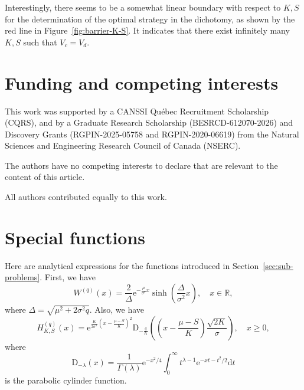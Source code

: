 \documentclass[11pt,reqno]{amsart}
\newcommand{\reals}{\mathbb{R}}
\newcommand{\Wq}{W^{(q)}}
\newcommand{\Hq}{H^{(q)}_{K,S}}
\renewcommand{\geq}{\geqslant}
\begin{document}
Interestingly, there seems to be a somewhat linear boundary with respect to $K,S$ for the determination of the optimal strategy in the dichotomy, as shown by the red line in Figure~\ref{fig:barrier-K-S}. It indicates that there exist infinitely many $K,S$ such that $V_c=V_d$.

\section*{Funding and competing interests}

This work was supported by a CANSSI Qu\'ebec Recruitment Scholarship (CQRS), and by a Graduate Research Scholarship (BESRCD-612070-2026) and Discovery Grants (RGPIN-2025-05758 and RGPIN-2020-06619) from the Natural Sciences and Engineering Research Council of Canada (NSERC).

The authors have no competing interests to declare that are relevant to the content of this article.

All authors contributed equally to this work.


\appendix


\section{Special functions}\label{app:scalefunctions}

Here are analytical expressions for the functions introduced in Section~\ref{sec:sub-problems}. First, we have
\begin{equation}
    \Wq(x)= \frac{2}{\Delta} \mathrm{e}^{-\frac{\mu}{\sigma^2} x} \sinh \left(\frac{\Delta}{\sigma^2} x \right), \quad x\in\reals,
\end{equation}
where $\Delta = \sqrt{\mu^2 + 2\sigma^2 q}$. Also, we have
\begin{equation}
    \Hq(x) = \mathrm{e}^{\frac{K}{2\sigma^2} \left(x-\frac{\mu-S}{K}\right)^2} \mathrm{D}_{-\frac qK} \left(\left(x-\frac{\mu-S}{K} \right) \frac{\sqrt{2K}}{\sigma} \right), \quad x\geq 0,
\end{equation}
where
\begin{equation}
    \mathrm{D}_{-\lambda}(x) = \frac{1}{\Gamma(\lambda)} \mathrm{e}^{-x^2/4} \int_0^\infty t^{\lambda-1} \mathrm{e}^{-xt-t^2/2} \mathrm{d}t 
\end{equation}
is the parabolic cylinder function.
\end{document}
